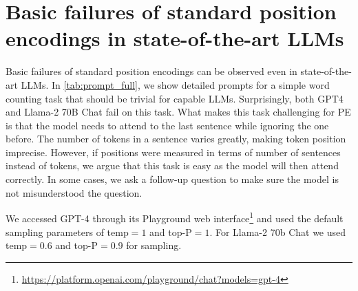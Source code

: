 \documentclass{article}
\begin{document}



\appendix

\section{Basic failures of standard position encodings in state-of-the-art LLMs}
\label{app:failures}
Basic failures of standard position encodings can be observed even in state-of-the-art LLMs.
In \cref{tab:prompt_full}, we show detailed prompts for a simple word counting task that should be trivial for capable LLMs. Surprisingly, both GPT4 and Llama-2 70B Chat  fail on this task.
What makes this task challenging for PE is that the model needs to attend to the last sentence while ignoring the one before.
The number of tokens in a sentence varies greatly, making token position imprecise.
However, if positions were measured in terms of number of sentences instead of tokens, we argue that this task is easy as the model will then attend correctly.
In some cases, we ask a follow-up question to make sure the model is not misunderstood the question.

We accessed GPT-4 through its Playground web interface\footnote{\url{https://platform.openai.com/playground/chat?models=gpt-4}} and used the default sampling parameters of temp$=1$ and top-P$=1$.
For Llama-2 70b Chat we used temp$=0.6$ and top-P$=0.9$ for sampling.
\end{document}
